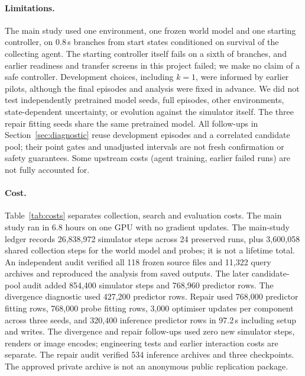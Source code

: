 \documentclass[sigconf,dvipsnames]{acmart}
\begin{document}
\paragraph{Limitations.}
The main study used one environment, one frozen world model and one starting controller,
on 0.8\,s branches from start states conditioned on survival of the collecting
agent. The starting controller itself fails on a sixth of branches, and earlier
readiness and transfer screens in this project failed; we make no claim of a
safe controller. Development choices, including $k=1$, were informed by earlier
pilots, although the final episodes and analysis were fixed in advance. We did
not test independently pretrained model seeds, full episodes, other environments,
state-dependent uncertainty, or evolution against the simulator itself. The
three repair fitting seeds share the same pretrained model. All follow-ups in
Section~\ref{sec:diagnostic} reuse development episodes and a correlated
candidate pool; their point gates and unadjusted intervals are not fresh
confirmation or safety guarantees. Some upstream costs (agent training, earlier failed runs) are
not fully accounted for.

\paragraph{Cost.}
Table~\ref{tab:costs} separates collection, search and evaluation costs. The
main study ran in 6.8 hours on one GPU with no gradient updates. The main-study
ledger records 26,838,972 simulator steps across 24 preserved runs, plus
3,600,058 shared collection steps for the world model and probes; it is not a
lifetime total. An independent
audit verified all 118 frozen source files and 11,322 query archives and
reproduced the analysis from saved outputs. The later candidate-pool audit
added 854,400 simulator steps and 768,960 predictor rows. The divergence
diagnostic used 427,200 predictor rows. Repair used 768,000 predictor fitting rows,
768,000 probe fitting rows, 3,000 optimiser updates per component across three
seeds, and 320,400 inference predictor rows in 97.2\,s including setup and
writes. The divergence and repair follow-ups used zero new simulator steps, renders
or image encodes;
engineering tests and earlier interaction costs are separate. The repair audit
verified 534 inference archives and three checkpoints. The approved private
archive is not an anonymous public replication package.
\end{document}
